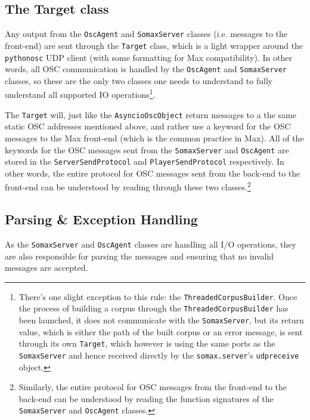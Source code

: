 
\subsection{The Target class}\label{ssec:2-target-class}

Any output from the \texttt{OscAgent} and \texttt{SomaxServer} classes (i.e. messages to the front-end) are sent through the \texttt{Target} class, which is a light wrapper around the \texttt{pythonosc} UDP client (with some formatting for Max compatibility). In other words, all OSC communication is handled by the \texttt{OscAgent} and \texttt{SomaxServer} classes, so these are the only two classes one needs to understand to fully understand all supported IO operations\footnote{There's one slight exception to this rule: the \texttt{ThreadedCorpusBuilder}. Once the process of building a corpus through the \texttt{ThreadedCorpusBuilder} has been launched, it does not communicate with the \texttt{SomaxServer}, but its return value, which is either the path of the built corpus or an error message, is sent through its own \texttt{Target}, which however is using the same ports as the \texttt{SomaxServer} and hence received directly by the \texttt{somax.server}'s \texttt{udpreceive} object.}. 

The \texttt{Target} will, just like the \texttt{AsyncioOscObject} return messages to a the same static OSC addresses mentioned above, and rather use a keyword for the OSC messages to the Max front-end (which is the common practice in Max). All of the keywords for the OSC messages sent from the \texttt{SomaxServer} and \texttt{OscAgent} are stored in the \texttt{ServerSendProtocol} and \texttt{PlayerSendProtocol} respectively. In other words, the entire protocol for OSC messages sent from the back-end to the front-end can be understood by reading through these two classes.\footnote{Similarly, the entire protocol for OSC messages from the front-end to the back-end can be understood by reading the function signatures of the \texttt{SomaxServer} and \texttt{OscAgent} classes.}


\subsection{Parsing \& Exception Handling}\label{ssec:2-parsing-introspective}
As the \texttt{SomaxServer} and \texttt{OscAgent} classes are handling all I/O operations, they are also responsible for parsing the messages and ensuring that no invalid messages are accepted. 

